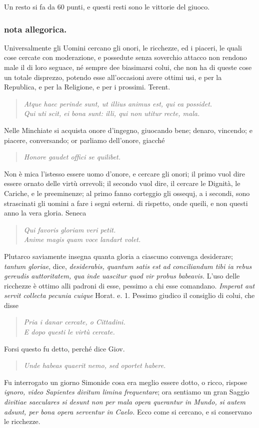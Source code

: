 \documentclass[11pt,a6paper]{article}
\newcommand{\literaryquote}[1]{%
\kern -6pt  \begin{verse}
    {\footnotesize \it #1}
  \end{verse}\kern -2pt%
}
\begin{document}
Un resto si fa da 60 punti, e questi resti
sono le vittorie del giuoco.

\subsubsection{nota allegorica.}
{\footnotesize
Universalmente gli Uomini cercano gli onori,
le ricchezze, ed i piaceri, le quali cose cercate con
moderazione, e possedute senza soverchio attacco
non rendono male il di loro seguace, né sempre dee
biasimarsi colui, che non ha di queste cose un totale
disprezzo, potendo esse all'occasioni avere ottimi
usi, e per la Republica, e per la Religione, e per
i prossimi. Terent.

\literaryquote{Atque haec perinde sunt, ut illius animus est, qui ea possidet.\\
Qui uti scit, ei bona sunt: illi, qui non utitur recte, mala.}

Nelle Minchiate si acquista onore d'ingegno, giuocando
bene; denaro, vincendo; e piacere, conversando;
or parliamo dell'onore, giacché

\literaryquote{Honore gaudet offici se quilibet.}

Non è mica l'istesso essere uomo d'onore, e
cercare gli onori; il primo vuol dire essere ornato
delle virtù orrevoli; il secondo vuol dire, il cercare
le Dignità, le Cariche, e le preeminenze; al primo
fanno corteggio gli ossequj, a i secondi, sono
strascinati gli uomini a fare i segni esterni. di rispetto,
onde queili, e non questi anno la vera gloria. Seneca

\literaryquote{Qui favoris gloriam veri petit.\\
Anime magis quam voce landart volet.}

Plutarco saviamente insegna quanta gloria a ciascuno
convenga desiderare; \textit{tantum gloriae}, dice,
\textit{desiderabis, quantum satis est ad conciliandum tibi ia
rebus gereudis auttoritatem, qua inde uascitur
quod vir probus babeavis.}
L'uso delle ricchezze è ottimo alli padroni di
esse, pessimo a chi esse comandano. \textit{Imperat aut
servit collecta pecunia cuique} Horat. e. 1.
Pessimo giudico il consiglio di colui, che disse

\literaryquote{ Pria i danar cercate, o Cittadini.\\
 E dopo questi le virtù cercate.}

Forsi questo fu detto, perché dice Giov.

\literaryquote{Unde habeas quaerit nemo, sed oportet habere.}

Fu interrogato un giorno Simonide cosa era meglio
essere dotto, o ricco, rispose \textit{ignoro, video Sapientes
divitum limina frequentare}; ora sentiamo un gran
Saggio \textit{divitiae saeculares si desunt non per mala
 opera querantur in Mundo, si autem adsunt, per bona
opera serventur in Caelo.} Ecco come si cercano, e si
conservano le ricchezze.
}
\end{document}

